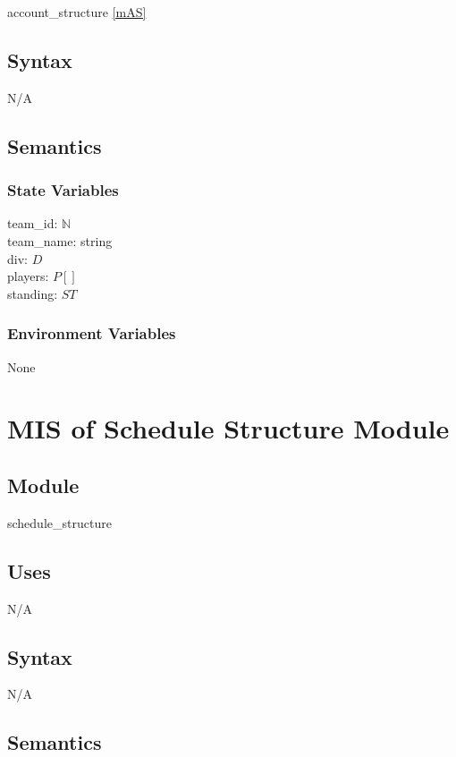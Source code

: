 \documentclass[12pt, titlepage]{article}
\begin{document}
account\_structure \ref{mAS}

\subsection{Syntax}

N/A

\subsection{Semantics}

\subsubsection{State Variables}

team\_id: $\mathbb{N}$\\
team\_name: string\\
div: $D$\\
players: $P[]$\\
standing: $ST$

\subsubsection{Environment Variables}

None

\newpage

\section{MIS of Schedule Structure Module} \label{mSS}

\subsection{Module}

schedule\_structure

\subsection{Uses}

N/A

\subsection{Syntax}

N/A

\subsection{Semantics}
\end{document}
